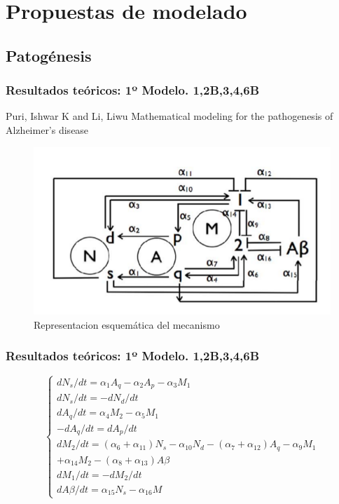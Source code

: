 \documentclass{beamer}
\begin{document}
\section{Propuestas de modelado}

\subsection{Patogénesis}
\begin{frame}
  \frametitle{Resultados teóricos: 1º Modelo. 1,2B,3,4,6B}
\begin{block}{Puri, Ishwar K and Li, Liwu}
	Mathematical modeling for the pathogenesis of Alzheimer's disease
	\end{block}
	\begin{figure}[Esquema]
		\includegraphics[scale=0.3]{primerdiagrama1.png}
		\caption{Representacion esquemática del mecanismo}
		\label{cerebro2}
	\end{figure}
\end{frame}

\begin{frame}
	\frametitle{Resultados teóricos: 1º Modelo. 1,2B,3,4,6B}
	\begin{equation}
	\left\lbrace
	\begin{array}{ll}
		dN_s/dt=\alpha_1A_q-\alpha_2A_p-\alpha_3M_1 \\
		dN_s/dt=-dN_d/dt\\
		dA_q/dt=\alpha_4M_2-\alpha_5M_1 \\
		-dA_q/dt=dA_p/dt \\
		dM_2/dt=(\alpha_6+\alpha_{11})N_s-\alpha_{10}N_d-(\alpha_7+\alpha_{12})A_q-\alpha_9M_1\\+\alpha_{14}M_2-(\alpha_8+\alpha_{13})A\beta\\
		dM_1/dt=-dM_2/dt \\
		dA\beta/dt=\alpha_{15}N_s-\alpha_{16}M
	\end{array}
	\right.
\end{equation}

\end{frame}
\end{document}
